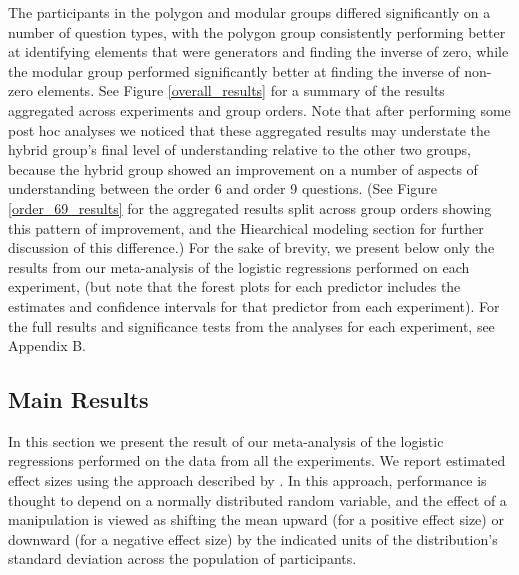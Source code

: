 \documentclass[man,mask,10pt]{apa6}
\begin{document}
The participants in the polygon and modular groups differed significantly on a number of question types, with the polygon group consistently performing better at identifying elements that were generators and finding the inverse of zero, while the modular group performed significantly better at finding the inverse of non-zero elements. See Figure \ref{overall_results} for a summary of the results aggregated across experiments and group orders. Note that after performing some post hoc analyses we noticed that these aggregated results may understate the hybrid group's final level of understanding relative to the other two groups, because the hybrid group showed an improvement on a number of aspects of understanding between the order 6 and order 9 questions. (See Figure \ref{order_69_results} for the aggregated results split across group orders showing this pattern of improvement, and the Hiearchical modeling section for further discussion of this difference.) For the sake of brevity, we present below only the results from our meta-analysis of the logistic regressions performed on each experiment, (but note that the forest plots for each predictor includes the estimates and confidence intervals for that predictor from each experiment). For the full results and significance tests from the analyses for each experiment, see Appendix B.  
\subsection{Main Results}
In this section we present the result of our meta-analysis of the logistic regressions performed on the data from all the experiments. We report estimated effect sizes using the approach described by . In this approach, performance is thought to depend on a normally distributed random variable, and the effect of a manipulation is viewed as shifting the mean upward (for a positive effect size) or downward (for a negative effect size) by the indicated units of the distribution's standard deviation across the population of participants.  
\end{document}
